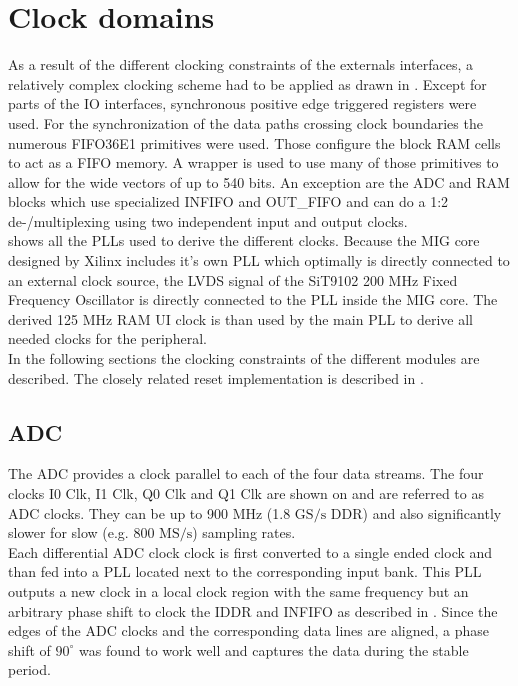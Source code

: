 \section{Clock domains}
\label{sec:fpga_clocks}

As a result of the different clocking constraints of the externals interfaces,
a relatively complex clocking scheme had to be applied as drawn in
. Except for parts of the \gls{IO} interfaces,
synchronous positive edge triggered registers were used. For the synchronization
of the data paths crossing clock boundaries the numerous FIFO36E1 primitives
were used. Those configure the block \gls{RAM} cells to act as a \gls{FIFO}
memory. A wrapper is used to use many of those primitives to allow for the
wide vectors of up to 540 bits.
An exception are the \gls{ADC} and \gls{RAM} blocks which use
specialized \gls{INFIFO} and OUT\_FIFO and can do a 1:2 de-/multiplexing
using two independent input and output clocks. \\

 shows all the \glspl{PLL} used to derive the
different clocks. Because the \gls{MIG} core designed by Xilinx includes
it's own \gls{PLL} which optimally is directly connected to an external
clock source, the \gls{LVDS} signal of the SiT9102 200 MHz Fixed Frequency
Oscillator is directly connected to the \gls{PLL} inside the \gls{MIG} core.
The derived 125 MHz \gls{RAM} \gls{UI} clock is than used by the main
\gls{PLL} to derive all needed clocks for the peripheral. \\

In the following sections the clocking constraints of the different modules
are described. The closely related reset implementation is described
in . \\

\subsection{\gls{ADC}}
The \gls{ADC} provides a clock parallel to each of the four data streams.
The four clocks I0 Clk, I1 Clk, Q0 Clk and Q1 Clk are shown on
 and are referred to as \gls{ADC} clocks.
They can be up to 900 MHz (1.8 $\text{GS}/\text{s}$ \gls{DDR})
and also significantly slower for slow (e.g. 800 $\text{MS}/\text{s}$)
sampling rates. \\

Each differential \gls{ADC} clock clock is first converted to a single ended
clock and than fed into a \gls{PLL} located next to the corresponding input
bank. This \gls{PLL} outputs a new clock in a local clock region
with the same frequency but an arbitrary phase shift
to clock the \gls{IDDR} and \gls{INFIFO} as described in .
Since the edges of the \gls{ADC} clocks and the corresponding data lines
are aligned, a phase shift of $90^\circ$ was found to work well and captures
the data during the stable period. \\

